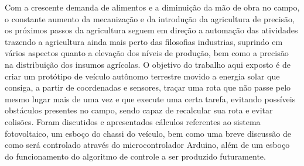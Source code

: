 \begin{resumo}

Com a crescente demanda de alimentos e a diminuição da mão de obra no campo, o constante aumento da mecanização e da introdução da agricultura de precisão, os próximos passos da agricultura seguem em direção a automação das atividades trazendo a agricultura ainda mais perto das filosofias industrias, suprindo em vários aspectos   quanto a elevação dos níveis de produção, bem como a precisão na distribuição dos insumos agrícolas. O objetivo do trabalho aqui exposto é de criar um protótipo de veículo autônomo terrestre movido a energia solar que consiga, a partir de coordenadas e sensores, traçar uma rota que não passe pelo mesmo lugar mais de uma vez e que execute uma certa tarefa, evitando possíveis obstáculos presentes no campo, sendo capaz de recalcular sua rota e evitar colisões. Foram discutidos e apresentados cálculos referentes ao sistema fotovoltaico, um esboço do chassi do veículo, bem como uma breve discussão de como será controlado através do microcontrolador Arduino, além de um esboço do funcionamento do algoritmo de controle a ser produzido futuramente.


\end{resumo}